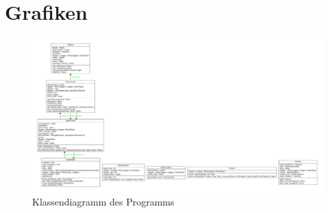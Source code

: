 \section{Grafiken}

\begin{figure}[H]
    \centering
    \includegraphics[width=\textwidth, angle=90]{../python/uml/classes.pdf}
    \caption{Klassendiagramm des Programms}
    \label{fig:classes}
\end{figure}